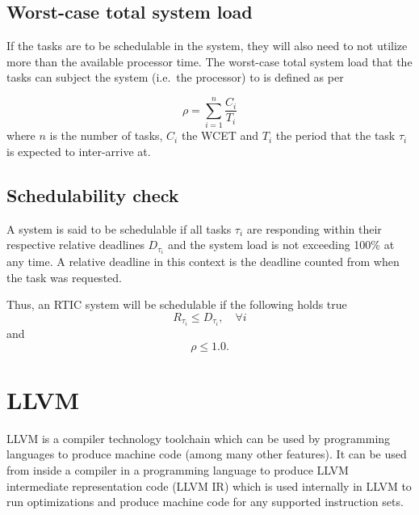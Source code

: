 \subsection{Worst-case total system load}
If the tasks are to be schedulable in the system, they will also need to not
utilize more than the available processor time. The worst-case total system
load that the tasks can subject the system (i.e.\ the processor) to is defined
as per~\cite{hardrealtimecomputingsystems}

\begin{equation}
    \rho = \sum^{n}_{i=1} \frac{C_i}{T_i}
\end{equation}
where $n$ is the number of tasks, $C_i$ the WCET and $T_i$ the
period that the task $\tau_i$ is expected to inter-arrive at.

\subsection{Schedulability check}
A system is said to be schedulable if all tasks $\tau_i$ are responding within
their respective relative deadlines $D_{\tau_i}$ and the system load is not exceeding
100\% at any time. A relative deadline in this context is the deadline counted
from when the task was requested.

Thus, an RTIC system will be schedulable if the following holds true
\begin{equation}
    R_{\tau_i} \leq D_{\tau_i}, \quad \forall i
\end{equation}
and
\begin{equation}
    \rho \leq 1.0.
\end{equation}


\section{LLVM}
LLVM is a compiler technology toolchain which can be used by programming
languages to produce machine code (among many other features). It can be used
from inside a compiler in a programming language to produce LLVM intermediate
representation code (LLVM IR) which is used internally in LLVM to run
optimizations and produce machine code for any supported instruction sets.

